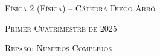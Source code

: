 \documentclass[11pt,spanish]{article}
\begin{document}
    \begin{center}
    \textsc{\large Física 2 (Física) -- Cátedra Diego Arbó}
    \par\end{center}{\large \par}
    
    \begin{center}
    \textsc{\large Primer Cuatrimestre de 2025}
    \par\end{center}{\large \par}
    
    \begin{center}
    \textsc{\large Repaso: Números Complejos}
    \par\end{center}{\large \par}
\end{document}
